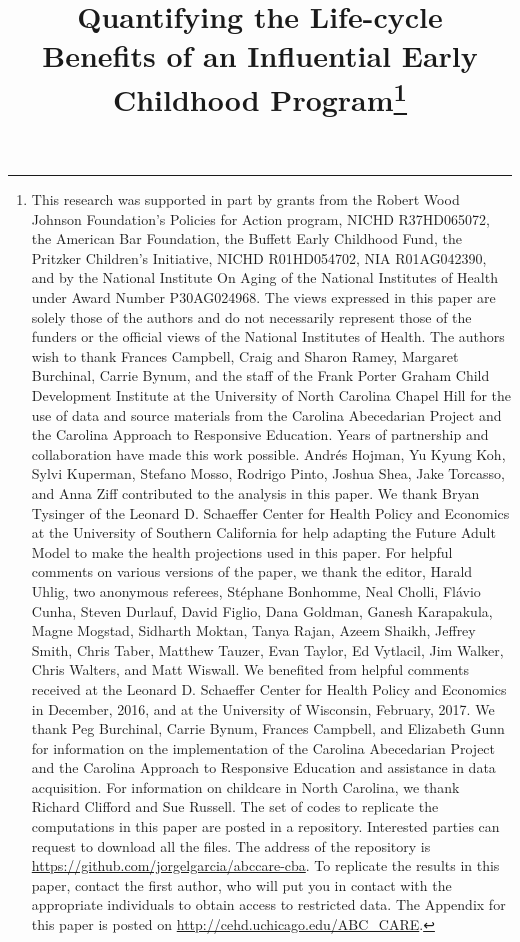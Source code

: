 \begin{titlepage}


\title{\Large \textbf{Quantifying the Life-cycle \\ Benefits of an Influential Early Childhood Program}\thanks{This research was supported in part by grants from the Robert Wood Johnson Foundation's Policies for Action program, NICHD R37HD065072, the American Bar Foundation, the Buffett Early Childhood Fund, the Pritzker Children's Initiative, NICHD R01HD054702, NIA R01AG042390, and by the National Institute On Aging of the National Institutes of Health under Award Number P30AG024968. The views expressed in this paper are solely those of the authors and do not necessarily represent those of the funders or the official views of the National Institutes of Health. The authors wish to thank Frances Campbell, Craig and Sharon Ramey, Margaret Burchinal, Carrie Bynum, and the staff of the Frank Porter Graham Child Development Institute at the University of North Carolina Chapel Hill for the use of data and source materials from the Carolina Abecedarian Project and the Carolina Approach to Responsive Education. Years of partnership and collaboration have made this work possible. Andr\'{e}s Hojman, Yu Kyung Koh, Sylvi Kuperman, Stefano Mosso, Rodrigo Pinto, Joshua Shea, Jake Torcasso, and Anna Ziff contributed to the analysis in this paper. We thank Bryan Tysinger of the Leonard D. Schaeffer Center for Health Policy and Economics at the University of Southern California for help adapting the Future Adult Model to make the health projections used in this paper. For helpful comments on various versions of the paper, we thank the editor, Harald Uhlig, two anonymous referees, St\'{e}phane Bonhomme, Neal Cholli, Fl\'{a}vio Cunha, Steven Durlauf, David Figlio, Dana Goldman, Ganesh Karapakula, Magne Mogstad, Sidharth Moktan, Tanya Rajan, Azeem Shaikh, Jeffrey Smith, Chris Taber, Matthew Tauzer, Evan Taylor, Ed Vytlacil, Jim Walker, Chris Walters, and Matt Wiswall. We benefited from helpful comments received at the Leonard D. Schaeffer Center for Health Policy and Economics in December, 2016, and at the University of Wisconsin, February, 2017. We thank Peg Burchinal, Carrie Bynum, Frances Campbell, and Elizabeth Gunn for information on the implementation of the Carolina Abecedarian Project and the Carolina Approach to Responsive Education and assistance in data acquisition. For information on childcare in North Carolina, we thank Richard Clifford and Sue Russell. The set of codes to replicate the computations in this paper are posted in a repository. Interested parties can request to download all the files. The address of the repository is \url{https://github.com/jorgelgarcia/abccare-cba}. To replicate the results in this paper, contact the first author, who will put you in contact with the appropriate individuals to obtain access to restricted data. The Appendix for this paper is posted on \url{http://cehd.uchicago.edu/ABC_CARE}.}}


\end{titlepage}
